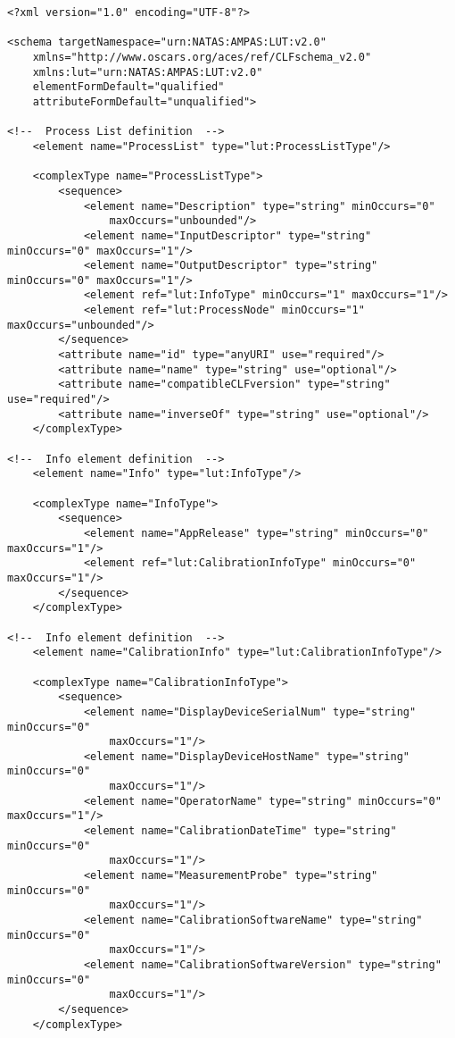 \label{appendixA}

\lstset{frame=none}
\begin{lstlisting}
<?xml version="1.0" encoding="UTF-8"?>

<schema targetNamespace="urn:NATAS:AMPAS:LUT:v2.0" 
    xmlns="http://www.oscars.org/aces/ref/CLFschema_v2.0" 
    xmlns:lut="urn:NATAS:AMPAS:LUT:v2.0" 
    elementFormDefault="qualified"
    attributeFormDefault="unqualified">

<!--  Process List definition  -->
    <element name="ProcessList" type="lut:ProcessListType"/>

    <complexType name="ProcessListType">
        <sequence>
            <element name="Description" type="string" minOccurs="0" 
                maxOccurs="unbounded"/>
            <element name="InputDescriptor" type="string" minOccurs="0" maxOccurs="1"/>
            <element name="OutputDescriptor" type="string" minOccurs="0" maxOccurs="1"/>
            <element ref="lut:InfoType" minOccurs="1" maxOccurs="1"/>
            <element ref="lut:ProcessNode" minOccurs="1" maxOccurs="unbounded"/>
        </sequence>
        <attribute name="id" type="anyURI" use="required"/>
        <attribute name="name" type="string" use="optional"/>
        <attribute name="compatibleCLFversion" type="string" use="required"/>
        <attribute name="inverseOf" type="string" use="optional"/>
    </complexType>

<!--  Info element definition  -->
    <element name="Info" type="lut:InfoType"/>

    <complexType name="InfoType">
        <sequence>
            <element name="AppRelease" type="string" minOccurs="0" maxOccurs="1"/>
            <element ref="lut:CalibrationInfoType" minOccurs="0" maxOccurs="1"/>
        </sequence>
    </complexType>

<!--  Info element definition  -->
    <element name="CalibrationInfo" type="lut:CalibrationInfoType"/>

    <complexType name="CalibrationInfoType">
        <sequence>
            <element name="DisplayDeviceSerialNum" type="string" minOccurs="0" 
                maxOccurs="1"/>
            <element name="DisplayDeviceHostName" type="string" minOccurs="0" 
                maxOccurs="1"/>
            <element name="OperatorName" type="string" minOccurs="0" maxOccurs="1"/>
            <element name="CalibrationDateTime" type="string" minOccurs="0" 
                maxOccurs="1"/>
            <element name="MeasurementProbe" type="string" minOccurs="0" 
                maxOccurs="1"/>
            <element name="CalibrationSoftwareName" type="string" minOccurs="0" 
                maxOccurs="1"/>
            <element name="CalibrationSoftwareVersion" type="string" minOccurs="0" 
                maxOccurs="1"/>
        </sequence>
    </complexType>


\end{lstlisting}
